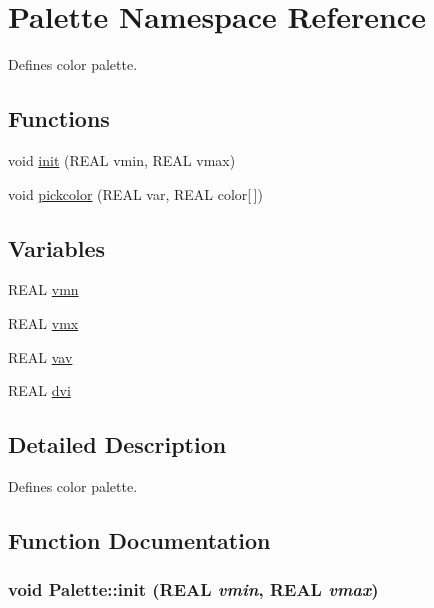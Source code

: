 \hypertarget{namespacePalette}{
\section{Palette Namespace Reference}
\label{namespacePalette}
}
Defines color palette.  


\subsection*{Functions}
\begin{CompactItemize}
\item 
void \hyperlink{namespacePalette_4dd1979a090b63cd9bcef668b8b6e254}{init} (REAL vmin, REAL vmax)
\item 
void \hyperlink{namespacePalette_f84836ad8d13add0db8b82462a42dd39}{pickcolor} (REAL var, REAL color\mbox{[}$\,$\mbox{]})
\end{CompactItemize}
\subsection*{Variables}
\begin{CompactItemize}
\item 
REAL \hyperlink{namespacePalette_17b5ab8ecd6038051c67291fb1428fdb}{vmn}
\item 
REAL \hyperlink{namespacePalette_811f17becae697d9244ef6fcde397618}{vmx}
\item 
REAL \hyperlink{namespacePalette_1e3ee247e7f094dd9c9ddbe9acbf1390}{vav}
\item 
REAL \hyperlink{namespacePalette_f145e3cb0ec135556136cb35b433ce9a}{dvi}
\end{CompactItemize}


\subsection{Detailed Description}
Defines color palette. 



\subsection{Function Documentation}
\hypertarget{namespacePalette_4dd1979a090b63cd9bcef668b8b6e254}{
\subsubsection[{init}]{\setlength{\rightskip}{0pt plus 5cm}void Palette::init (REAL {\em vmin}, \/  REAL {\em vmax})}}
\label{namespacePalette_4dd1979a090b63cd9bcef668b8b6e254}




